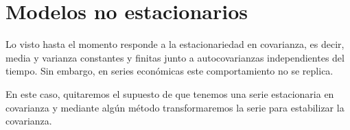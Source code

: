 \documentclass[a4paper,10pt]{article}
\begin{document}

\section{Modelos no estacionarios}

Lo visto hasta el momento responde a la estacionariedad en covarianza, es decir, media y varianza constantes y finitas junto a autocovarianzas independientes del tiempo. Sin embargo, en series económicas este comportamiento no se replica.

En este caso, quitaremos el supuesto de que tenemos una serie estacionaria en covarianza y mediante algún método transformaremos la serie para estabilizar la covarianza.

\end{document}
